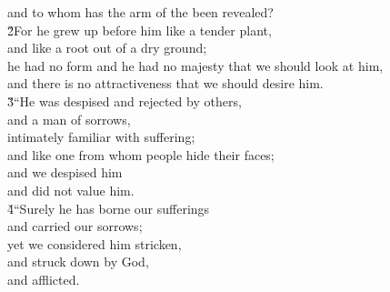 \begin{poetry}
\poemll    and to whom has the arm of the  been revealed? \\
\poeml \v{2}For he grew up before him like a tender plant, \\
\poemll    and like a root out of a dry ground; \\
\poeml he had no form and he had no majesty that we should look at him, \\
\poemll    and there is no attractiveness that we should desire him. \\
\poeml \v{3}``He was despised and rejected by others, \\
\poemll    and a man of sorrows, \\
\poemlll       intimately familiar with suffering; \\
\poeml and like one from whom people hide their faces; \\
\poemll    and we despised him \\
\poemlll       and did not value him. \\
\poeml \v{4}``Surely he has borne our sufferings \\
\poemll    and carried our sorrows; \\
\poeml yet we considered him stricken, \\
\poemll    and struck down by God, \\
\poemlll       and afflicted. \\

\end{poetry}
